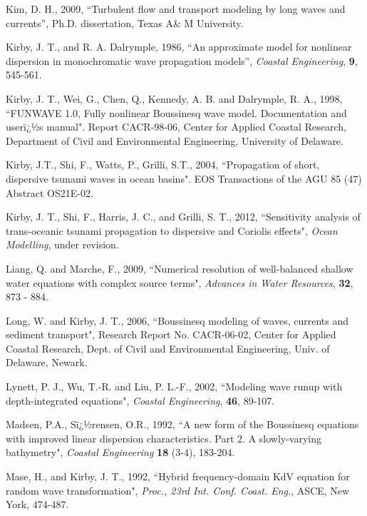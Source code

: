 \documentclass[11pt]{article}
\begin{document}
\begin{description}
\item Kim, D. H., 2009, ``Turbulent flow and transport modeling by long waves and currents'', Ph.D. dissertation, Texas A\& M University.

\item Kirby, J. T., and R. A. Dalrymple, 1986, ``An approximate model for nonlinear dispersion in monochromatic wave propagation models'', {\em Coastal Engineering}, {\bf 9}, 545-561.

\item Kirby, J. T., Wei, G., Chen, Q., Kennedy, A. B. and Dalrymple, R. A., 1998,  ``FUNWAVE 1.0, Fully nonlinear Boussinesq wave model. Documentation and userï¿½s manual". Report CACR-98-06, Center for Applied Coastal Research, Department of Civil and Environmental Engineering, University of Delaware.

\item Kirby, J.T., Shi, F., Watts, P., Grilli, S.T., 2004,  ``Propagation of short, dispersive tsunami waves in ocean basins". EOS Transactions of the AGU 85 (47) Abstract OS21E-02.

\item Kirby, J. T., Shi, F., Harris, J. C., and Grilli, S. T., 2012, ``Sensitivity analysis of trans-oceanic tsunami propagation to dispersive and Coriolis effects", {\em Ocean Modelling}, under revision.  

\item Liang, Q. and Marche, F., 2009, ``Numerical resolution of well-balanced shallow water equations with complex source terms", {\em Advances in Water Resources}, {\bf 32}, 873 - 884.

\item Long, W. and Kirby, J. T., 2006,  ``Boussinesq modeling of waves, currents and sediment transport", Research Report No. CACR-06-02, Center for Applied Coastal Research, Dept. of Civil and Environmental Engineering, Univ. of Delaware, Newark. 

\item Lynett, P. J., Wu, T.-R. and Liu, P. L.-F., 2002,  ``Modeling wave runup with depth-integrated equations",  {\em Coastal Engineering},  
{\bf 46}, 89-107.

\item Madsen, P.A., Sï¿½rensen, O.R., 1992,  ``A new form of the Boussinesq equations with improved linear dispersion characteristics. Part 2. A slowly-varying bathymetry",  {\em Coastal Engineering}  {\bf 18} (3-4), 183-204.


\item Mase, H., and Kirby, J. T., 1992,   ``Hybrid frequency-domain KdV equation for random wave transformation", {\em Proc., 23rd Int. Conf. Coast. Eng.}, ASCE, New York, 474-487.


\end{description}
\end{document}
